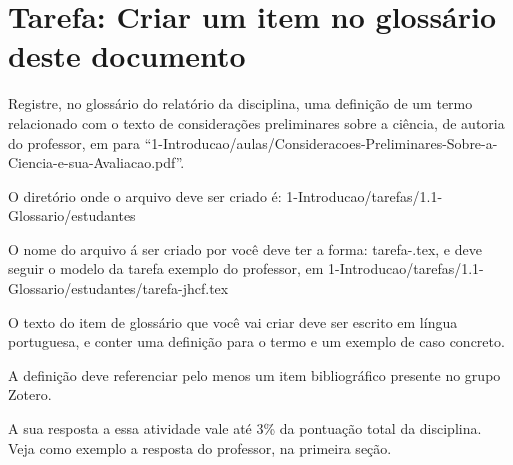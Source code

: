 \section{Tarefa: Criar um item no glossário deste documento \label{tarefa:glossario}}

Registre, no glossário do relatório da disciplina, uma definição de um termo relacionado com o texto de considerações preliminares sobre a ciência, de autoria do professor, em para ``1-Introducao/aulas/Consideracoes-Preliminares-Sobre-a-Ciencia-e-sua-Avaliacao.pdf''.

O diretório onde o arquivo deve ser criado é: 
1-Introducao/tarefas/1.1-Glossario/estudantes

O nome do arquivo á ser criado por você deve ter a forma:
tarefa-\githubusername.tex, e deve seguir o modelo da tarefa exemplo do professor, em
1-Introducao/tarefas/1.1-Glossario/estudantes/tarefa-jhcf.tex

O texto do item de glossário que você vai criar deve ser escrito em língua portuguesa, e conter uma definição para o termo e um exemplo de caso concreto.

A definição deve referenciar pelo menos um item bibliográfico presente no grupo Zotero.

A sua resposta a essa atividade vale até 3\% da pontuação total da disciplina.
Veja como exemplo a resposta do professor, na primeira seção.